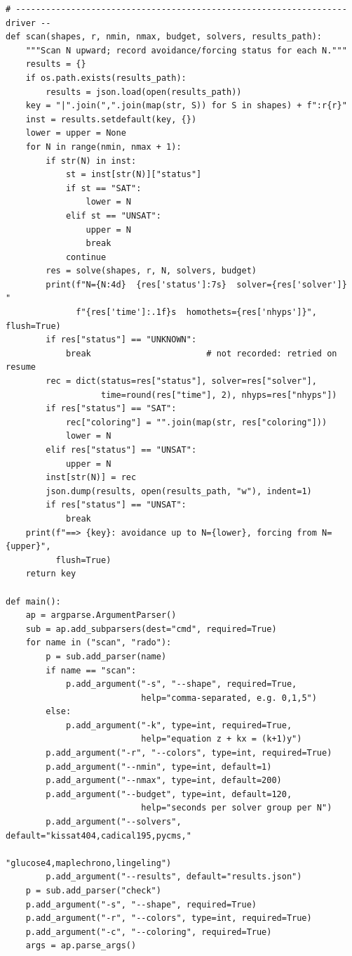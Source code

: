 \documentclass[12pt]{article}
\begin{document}
\begin{lstlisting}[style=plainstyle]
# ------------------------------------------------------------------ driver --
def scan(shapes, r, nmin, nmax, budget, solvers, results_path):
    """Scan N upward; record avoidance/forcing status for each N."""
    results = {}
    if os.path.exists(results_path):
        results = json.load(open(results_path))
    key = "|".join(",".join(map(str, S)) for S in shapes) + f":r{r}"
    inst = results.setdefault(key, {})
    lower = upper = None
    for N in range(nmin, nmax + 1):
        if str(N) in inst:
            st = inst[str(N)]["status"]
            if st == "SAT":
                lower = N
            elif st == "UNSAT":
                upper = N
                break
            continue
        res = solve(shapes, r, N, solvers, budget)
        print(f"N={N:4d}  {res['status']:7s}  solver={res['solver']}  "
              f"{res['time']:.1f}s  homothets={res['nhyps']}", flush=True)
        if res["status"] == "UNKNOWN":
            break                       # not recorded: retried on resume
        rec = dict(status=res["status"], solver=res["solver"],
                   time=round(res["time"], 2), nhyps=res["nhyps"])
        if res["status"] == "SAT":
            rec["coloring"] = "".join(map(str, res["coloring"]))
            lower = N
        elif res["status"] == "UNSAT":
            upper = N
        inst[str(N)] = rec
        json.dump(results, open(results_path, "w"), indent=1)
        if res["status"] == "UNSAT":
            break
    print(f"==> {key}: avoidance up to N={lower}, forcing from N={upper}",
          flush=True)
    return key

def main():
    ap = argparse.ArgumentParser()
    sub = ap.add_subparsers(dest="cmd", required=True)
    for name in ("scan", "rado"):
        p = sub.add_parser(name)
        if name == "scan":
            p.add_argument("-s", "--shape", required=True,
                           help="comma-separated, e.g. 0,1,5")
        else:
            p.add_argument("-k", type=int, required=True,
                           help="equation z + kx = (k+1)y")
        p.add_argument("-r", "--colors", type=int, required=True)
        p.add_argument("--nmin", type=int, default=1)
        p.add_argument("--nmax", type=int, default=200)
        p.add_argument("--budget", type=int, default=120,
                           help="seconds per solver group per N")
        p.add_argument("--solvers", default="kissat404,cadical195,pycms,"
                                            "glucose4,maplechrono,lingeling")
        p.add_argument("--results", default="results.json")
    p = sub.add_parser("check")
    p.add_argument("-s", "--shape", required=True)
    p.add_argument("-r", "--colors", type=int, required=True)
    p.add_argument("-c", "--coloring", required=True)
    args = ap.parse_args()


\end{lstlisting}
\end{document}
